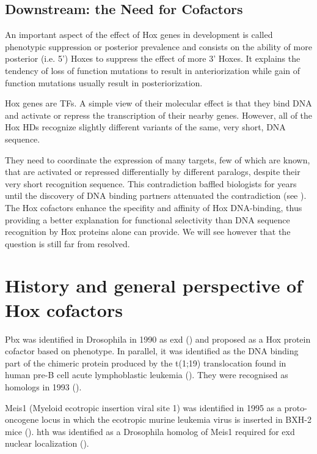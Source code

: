 

\subsection{Downstream: the Need for Cofactors}

An important aspect of the effect of Hox genes in development is called phenotypic suppression \parencite{Gonzalez-Reyes1990} or posterior prevalence \parencite{Lufkin1991} and consists on the ability of more posterior (i.e. 5') Hoxes to suppress the effect of more 3' Hoxes. It explains the tendency of loss of function mutations to result in anteriorization while gain of function mutations usually result in posteriorization.

Hox genes are \acp{TF}. A simple view of their molecular effect is that they bind DNA and activate or repress the transcription of their nearby genes. However, all of the Hox \acp{HD} recognize slightly different  variants of the same, very short, DNA sequence. 

They need to coordinate the expression of many targets, few of which are known, that are activated or repressed differentially by different paralogs, despite their very short recognition sequence. This contradiction baffled biologists for years until the discovery of DNA binding partners attenuated the contradiction (see \cite{Mann1996}). The Hox cofactors enhance the specifity and affinity of Hox DNA-binding, thus providing a better explanation for functional selectivity than DNA sequence recognition by Hox proteins alone can provide. We will see however that the question is still far from resolved. 


\section{History and general perspective of Hox cofactors}

Pbx was identified in Drosophila in 1990 as \ac{exd} (\cite{Peifer1990}) and proposed as a Hox protein cofactor based on phenotype. In parallel, it was identified as the DNA binding part of the chimeric protein produced by the t(1;19) translocation found in human pre-B cell acute lymphoblastic leukemia (\cite{Kamps1990}). They were recognised as homologs in 1993 (\cite{Rauskolb1993}).

Meis1 (Myeloid ecotropic insertion viral site 1) was identified in 1995 as a proto-oncogene locus in which the ecotropic murine leukemia virus is inserted in BXH-2 mice (\cite{Moskow1995}). \ac{hth} was identified as a Drosophila homolog of Meis1 required for \ac{exd} nuclear localization (\cite{Rauskolb1995, Rieckhof1997}).

